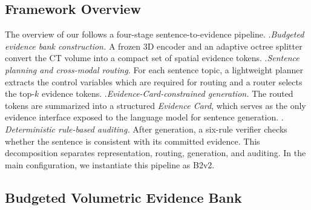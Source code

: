 \subsection{Framework Overview}
\label{sec:framework_overview}

The overview of our \method{} follows a four-stage sentence-to-evidence pipeline.
 .\textit{Budgeted evidence bank construction.} A frozen 3D encoder and an adaptive octree splitter convert the CT volume into a compact set of spatial evidence tokens. .\textit{Sentence planning and cross-modal routing.} For each sentence topic, a lightweight planner extracts the control variables which are required for routing and a router selects the top-$k$ evidence tokens. .\textit{Evidence-Card-constrained generation.} The routed tokens are summarized into a structured \emph{Evidence Card}, which serves as the only evidence interface exposed to the language model for sentence generation. . \textit{Deterministic rule-based auditing.} After generation, a six-rule verifier checks whether the sentence is consistent with its committed evidence. This decomposition separates representation, routing, generation, and auditing. In the main configuration, we instantiate this pipeline as B2\textquotesingle v2.


\subsection{Budgeted Volumetric Evidence Bank}
\label{sec:evidence_bank}


